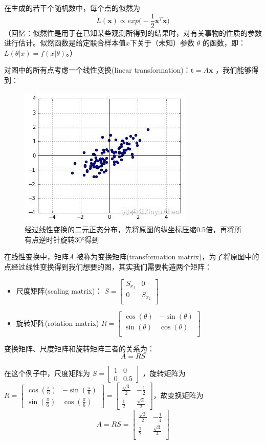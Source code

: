 \documentclass[12pt]{article}
\begin{document}
在生成的若干个随机数中，每个点的似然为
$$
L(\mathbf{x}) \propto exp\big(-\frac{1}{2}\mathbf{x}^T\mathbf{x}\big)
$$
（回忆：似然性是用于在已知某些观测所得到的结果时，对有关事物的性质的参数进行估计。似然函数是给定联合样本值$x$下关于（未知）参数 $\theta$ 的函数，即：$L(\theta|x) = f(x|\theta)$。）

对图中的所有点考虑一个线性变换(linear transformation)：$\mathbf{t} = A\mathbf{x}$ ，我们能够得到：
\begin{figure}[H]
\centering
\includegraphics[width=.3\textwidth]{fig/UnderstandCovarianceMatrix_3.jpg} 
\caption*{\small{经过线性变换的二元正态分布，先将原图的纵坐标压缩0.5倍，再将所有点逆时针旋转30°得到}}
\end{figure}

在线性变换中，矩阵$A$ 被称为变换矩阵(transformation matrix)，为了将原图中的点经过线性变换得到我们想要的图，其实我们需要构造两个矩阵：
\begin{itemize}
    \item 尺度矩阵(scaling matrix)：
$
S = \begin{bmatrix}
S_{x_1} & 0 \\
0 & S_{x_2} \\
\end{bmatrix}
$
    \item 旋转矩阵(rotation matrix)
$R = \begin{bmatrix}
\cos(\theta) & -\sin(\theta) \\
\sin(\theta) & \cos(\theta) \\
\end{bmatrix}
$
\end{itemize}

变换矩阵、尺度矩阵和旋转矩阵三者的关系为：
$$
A = RS
$$

在这个例子中，尺度矩阵为 $S = \begin{bmatrix}
1 & 0 \\ 0 & 0.5 \end{bmatrix}$ ，旋转矩阵为 $R = \begin{bmatrix}
\cos(\frac{\pi}{6}) & -\sin(\frac{\pi}{6}) \\
\sin(\frac{\pi}{6}) & \cos(\frac{\pi}{6})
\end{bmatrix} = \begin{bmatrix}
\frac{\sqrt{3}}{2} & -\frac{1}{2} \\
\frac{1}{2} & \frac{\sqrt{3}}{2}
\end{bmatrix}$，故变换矩阵为
$$
A = RS = \begin{bmatrix}
\frac{\sqrt{3}}{2} & -\frac{1}{4} \\
\frac{1}{2} & \frac{\sqrt{3}}{4} \\
\end{bmatrix}
$$
\end{document}
